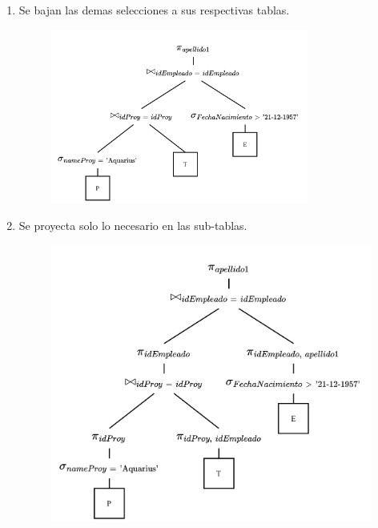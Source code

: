\documentclass{templateNote}
\begin{document}
\begin{enumerate}
\begin{enumerate}
\begin{enumerate}
            \item Se bajan las demas selecciones a sus respectivas tablas.
            \begin{figure}[H]
                \centering
                \includegraphics[width=0.8\textwidth]{img/E1-Paso5.png}
            \end{figure}

            \newpage
            \item Se proyecta solo lo necesario en las sub-tablas.
            \begin{figure}[H]
                \centering
                \includegraphics[width=\textwidth]{img/E1-Paso6.png}
            \end{figure}
        \end{enumerate}
    \end{enumerate}


\end{enumerate}
\end{document}
